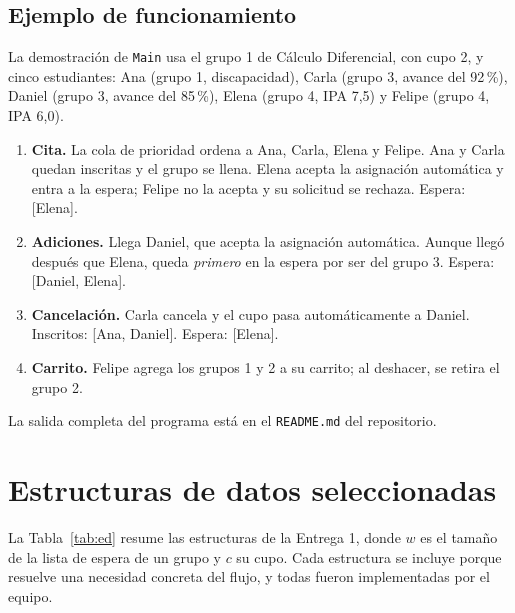 \documentclass[conference]{IEEEtran}
\begin{document}
\subsection{Ejemplo de funcionamiento}
La demostración de \texttt{Main} usa el grupo 1 de Cálculo Diferencial, con cupo 2, y cinco estudiantes: Ana (grupo 1, discapacidad), Carla (grupo 3, avance del 92\,\%), Daniel (grupo 3, avance del 85\,\%), Elena (grupo 4, IPA 7,5) y Felipe (grupo 4, IPA 6,0).
\begin{enumerate}
    \item \textbf{Cita.} La cola de prioridad ordena a Ana, Carla, Elena y Felipe. Ana y Carla quedan inscritas y el grupo se llena. Elena acepta la asignación automática y entra a la espera; Felipe no la acepta y su solicitud se rechaza. Espera: [Elena].
    \item \textbf{Adiciones.} Llega Daniel, que acepta la asignación automática. Aunque llegó después que Elena, queda \emph{primero} en la espera por ser del grupo 3. Espera: [Daniel, Elena].
    \item \textbf{Cancelación.} Carla cancela y el cupo pasa automáticamente a Daniel. Inscritos: [Ana, Daniel]. Espera: [Elena].
    \item \textbf{Carrito.} Felipe agrega los grupos 1 y 2 a su carrito; al deshacer, se retira el grupo 2.
\end{enumerate}
La salida completa del programa está en el \texttt{README.md} del repositorio.


\section{Estructuras de datos seleccionadas}

La Tabla~\ref{tab:ed} resume las estructuras de la Entrega 1, donde $w$ es el tamaño de la lista de espera de un grupo y $c$ su cupo. Cada estructura se incluye porque resuelve una necesidad concreta del flujo, y todas fueron implementadas por el equipo.
\end{document}
